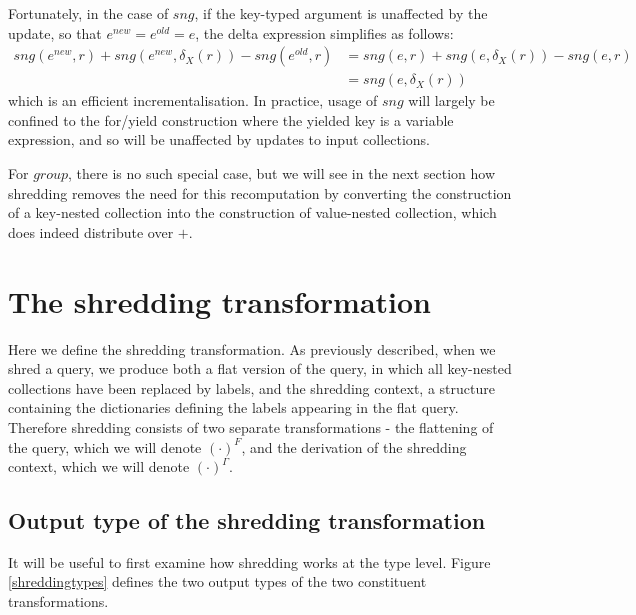 {{{Fortunately, in the case of $sng$, if the key-typed argument is unaffected by the update, so that $e^{new} = e^{old} = e$, the delta expression simplifies as follows:
\begin{equation*}
\begin{split}
sng(e^{new},r) + sng(e^{new},\delta_X(r)) - sng(e^{old},r) &= sng(e,r) + sng(e,\delta_X(r)) - sng(e,r) \\
&= sng(e,\delta_X(r))
\end{split}
\end{equation*}
which is an efficient incrementalisation. In practice, usage of $sng$ will largely be confined to the for/yield construction where the yielded key is a variable expression, and so will be unaffected by updates to input collections. 

For $group$, there is no such special case, but we will see in the next section how shredding removes the need for this recomputation by converting the construction of a key-nested collection into the construction of value-nested collection, which does indeed distribute over $+$.
	
}

\section{The shredding transformation} {

Here we define the shredding transformation. As previously described, when we shred a query, we produce both a flat version of the query, in which all key-nested collections have been replaced by labels, and the shredding context, a structure containing the dictionaries defining the labels appearing in the flat query. Therefore shredding consists of two separate transformations - the flattening of the query, which we will denote $(\cdot)^F$, and the derivation of the shredding context, which we will denote $(\cdot)^\Gamma$.

\subsection{Output type of the shredding transformation} {

It will be useful to first examine how shredding works at the type level. Figure \ref{shreddingtypes} defines the two output types of the two constituent transformations.

}}}}
